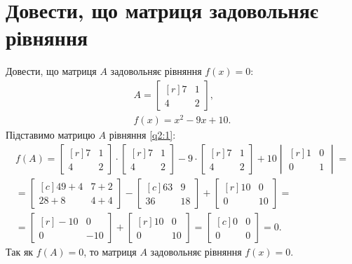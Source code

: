 \section{Довести, що матриця задовольняє рівняння}
Довести, що матриця \(A\) задовольняє рівняння \(f(x)=0\):
\begin{gather}
	A=\begin{bmatrix*}[r]
		7&1\\4&2
	\end{bmatrix*},\\ f(x)=x^2-9x+10.\label{q2:1}
\end{gather}
\solving
Підставимо матрицю \(A\) рівняння \eqref{q2:1}:
\begin{gather}
	f(A)=\begin{bmatrix*}[r]
		7&1\\4&2
	\end{bmatrix*}\cdot\begin{bmatrix*}[r]
	7&1\\4&2
\end{bmatrix*}-9\cdot\begin{bmatrix*}[r]
7&1\\4&2
\end{bmatrix*}+10\begin{vmatrix*}[r]
1&0\\0&1
\end{vmatrix*}=\\
=\begin{bmatrix*}[c]
	49+4&7+2\\
	28+8&4+4
\end{bmatrix*}-\begin{bmatrix*}[c]
63&9\\
36&18
\end{bmatrix*}+\begin{bmatrix*}[r]
10&0\\0&10
\end{bmatrix*}=\\
=\begin{bmatrix*}[r]
	-10&0\\0&-10
\end{bmatrix*}+\begin{bmatrix*}[r]
10&0\\0&10
\end{bmatrix*}=\begin{bmatrix*}[c]
0&0\\0&0
\end{bmatrix*}=0.
\end{gather}
Так як \(f(A)=0\), то матриця \(A\) задовольняє рівняння \(f(x)=0\).

